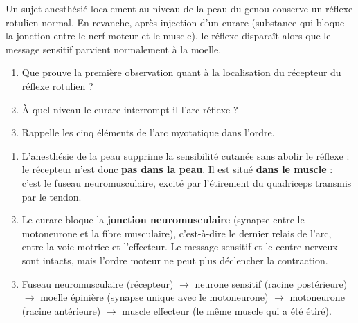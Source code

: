 \documentclass[11pt]{article}
\begin{document}
\begin{exercice}
Un sujet anesthésié localement au niveau de la peau du genou conserve un réflexe rotulien normal. En revanche, après injection d'un curare (substance qui bloque la jonction entre le nerf moteur et le muscle), le réflexe disparaît alors que le message sensitif parvient normalement à la moelle.
\begin{enumerate}
\item Que prouve la première observation quant à la localisation du récepteur du réflexe rotulien ?
\item À quel niveau le curare interrompt-il l'arc réflexe ?
\item Rappelle les cinq éléments de l'arc myotatique dans l'ordre.
\end{enumerate}
\end{exercice}

\begin{corrige}[Exercice]
\begin{enumerate}
\item L'anesthésie de la peau supprime la sensibilité cutanée sans abolir le réflexe : le récepteur n'est donc \textbf{pas dans la peau}. Il est situé \textbf{dans le muscle} : c'est le fuseau neuromusculaire, excité par l'étirement du quadriceps transmis par le tendon.
\item Le curare bloque la \textbf{jonction neuromusculaire} (synapse entre le motoneurone et la fibre musculaire), c'est-à-dire le dernier relais de l'arc, entre la voie motrice et l'effecteur. Le message sensitif et le centre nerveux sont intacts, mais l'ordre moteur ne peut plus déclencher la contraction.
\item Fuseau neuromusculaire (récepteur) $\rightarrow$ neurone sensitif (racine postérieure) $\rightarrow$ moelle épinière (synapse unique avec le motoneurone) $\rightarrow$ motoneurone (racine antérieure) $\rightarrow$ muscle effecteur (le même muscle qui a été étiré).
\end{enumerate}
\end{corrige}
\end{document}
